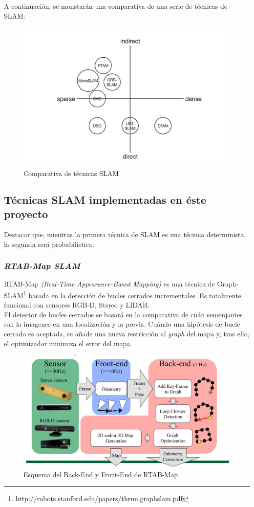 \begin{itemize}
A continuación, se monstarán una comparativa de una serie de técnicas de SLAM:
\begin{figure}[h!]
    \centering
    \includegraphics[width=.6\textwidth]{images/comp_slam}
    \caption{Comparativa de técnicas SLAM}
\end{figure}

\end{itemize}

\subsection{Técnicas SLAM implementadas en éste proyecto}
Destacar que, mientras la primera técnica de SLAM es una técnica determinista, la segunda será probabilistica.
\subsubsection{\textit{RTAB-Map SLAM}}
RTAB-Map \textit{(Real-Time Appearance-Based Mapping)} es una técnica de Graph-SLAM\footnote{http://robots.stanford.edu/papers/thrun.graphslam.pdf} basada en la detección de bucles cerrados incrementales. Es totalmente funcional 
con sensores RGB-D, Stereo y LIDAR. \\
El detector de bucles cerrados se basará en la comparativa de cuán semenjantes son la imagenes en una localización y la previa. Cuándo una hipótesis 
de bucle cerrado es aceptada, se añade una nueva restricción al \textit{graph} del mapa y, tras ello, el optimizador minimiza el error del mapa. \\

\begin{figure}[h!]
    \centering
    \includegraphics[width=.7\textwidth]{images/rtabmap_scheme}
    \caption{Esquema del Back-End y Front-End de RTAB-Map}
\end{figure}


